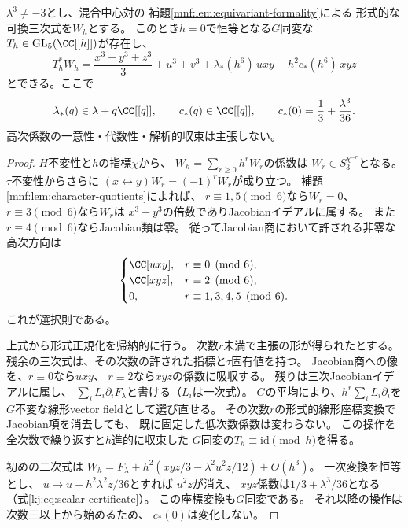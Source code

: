 \begin{theorem}
\label{mnf:thm:two-series}
$\lambda^3\ne-3$とし、混合中心対の
補題\ref{mnf:lem:equivariant-formality}による
形式的な可換三次式を$W_h$とする。
このとき$h=0$で恒等となる$G$同変な
$T_h\in\operatorname{GL}_5(\CC[[h]])$が存在し、
\begin{equation}\label{mnf:eq:normal-form}
 \boxed{\quad
 T_h^*W_h=
 \frac{x^3+y^3+z^3}{3}+u^3+v^3+
 \lambda_*(h^6)\,uxy+h^2c_*(h^6)\,xyz
 \quad}
\end{equation}
とできる。ここで
\[
 \lambda_*(q)\in\lambda+q\CC[[q]],\qquad
 c_*(q)\in\CC[[q]],\qquad
 c_*(0)=\frac13+\frac{\lambda^3}{36}.
\]
高次係数の一意性・代数性・解析的収束は主張しない。
\end{theorem}
\begin{proof}
$H$不変性と$h$の指標$\chi$から、
$W_h=\sum_{r\ge0}h^rW_r$の係数は
$W_r\in S_3^{\chi^{-r}}$となる。
$\tau$不変性からさらに
$(x\leftrightarrow y)W_r=(-1)^rW_r$が成り立つ。
補題\ref{mnf:lem:character-quotients}によれば、
$r\equiv1,5\pmod6$なら$W_r=0$、
$r\equiv3\pmod6$なら$W_r$は
$x^3-y^3$の倍数でありJacobianイデアルに属する。
また$r\equiv4\pmod6$ならJacobian類は零。
従ってJacobian商において許される非零な高次方向は
\[
 \begin{cases}
 \CC[uxy],&r\equiv0\pmod6,\\
 \CC[xyz],&r\equiv2\pmod6,\\
 0,&r\equiv1,3,4,5\pmod6.
 \end{cases}
\]
これが選択則である。

上式から形式正規化を帰納的に行う。
次数$r$未満で主張の形が得られたとする。
残余の三次式は、その次数の許された指標と$\tau$固有値を持つ。
Jacobian商への像を、$r\equiv0$なら$uxy$、
$r\equiv2$なら$xyz$の係数に吸収する。
残りは三次Jacobianイデアルに属し、
$\sum_iL_i\partial_iF_\lambda$と書ける（$L_i$は一次式）。
$G$の平均により、$h^r\sum_iL_i\partial_i$を
$G$不変な線形vector fieldとして選び直せる。
その次数$r$の形式的線形座標変換でJacobian項を消去しても、
既に固定した低次数係数は変わらない。
この操作を全次数で繰り返すと$h$進的に収束した
$G$同変の$T_h\equiv\mathrm{id}\pmod h$を得る。

初めの二次式は
$W_h=F_\lambda+h^2(xyz/3-\lambda^2u^2z/12)+O(h^3)$。
一次変換を恒等とし、
$u\mapsto u+h^2\lambda^2z/36$とすれば
$u^2z$が消え、
$xyz$係数は$1/3+\lambda^3/36$となる
（式\eqref{kj:eq:scalar-certificate}）。
この座標変換も$G$同変である。
それ以降の操作は次数三以上から始めるため、
$c_*(0)$は変化しない。
\end{proof}

